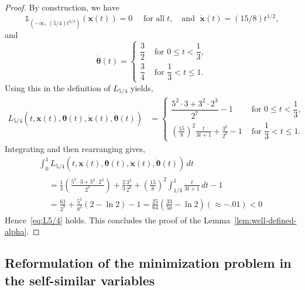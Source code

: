 \documentclass[AHL,Unicode,longabstracts]{cedram}
\newcommand{\bx}{\mathbf{x}}
\newcommand{\btheta}{\boldsymbol{\theta}}
\newcommand{\1}{\mathds{1}}
\begin{document}
\begin{proof}
By construction, we have
\[
\1_{\left(-\infty,\,(5/4) t^{3/2}\right)}(\bx(t))=0\quad\text{ for all}\;t, \quad\text{and }\;\dot{\bx}(t)=(15/8)t^{1/2},
\]
and
\[
\dot{\btheta}(t) =
\begin{cases}
\dfrac{3}{2} & \text{ for } 0\leq t<\dfrac{1}{3},
\\[0.70em]
\dfrac{3}{4}& \text{ for } \dfrac{1}{3}<t\leq 1.
\end{cases}
\]
Using this in the definition of $L_{5/4}$ yields,
\begin{align*}
L_{5/4}\left(t,\bx(t), \btheta(t), \dot{ \bx}(t), \dot{\btheta}(t)\right) &=
\begin{cases}
\dfrac{5^2\cdot 3+3^2\cdot 2^3}{2^7} -1 & \text{ for } 0\leq t<\dfrac{1}{3},
\\[0.50em]
\displaystyle \left(\frac{15}{8}\right)^2\frac{t}{3t+1} + \frac{3^2}{2^6}-1 & \text{ for } \dfrac{1}{3}<t\leq 1.
\end{cases}
\end{align*}
Integrating and then rearranging gives,
\begin{multline*}
\int_0^1L_{5/4}\left(t,\bx(t), \btheta(t), \dot{ \bx}(t), \dot{\btheta}(t)\right)\, dt \\
\begin{aligned}
&=\frac{1}{3}\left(\frac{5^2\cdot 3+3^2\cdot 2^3}{2^7}\right) + \frac{2}{3}\frac{3^2}{2^6} + \left(\frac{15}{8}\right)^2\int_{1/3}^{1}\frac{t}{3t+1}\, dt-1\\
&= \frac{61}{ 2^7}+\frac{5^2}{8^2}(2-\ln 2)-1 = \frac{25}{64}\left (\frac{33}{50} - \ln 2 \right)(\approx -.01)<0
\end{aligned}
\end{multline*}
Hence~\eqref{eq:L5/4} holds. This concludes the proof of the Lemma~\ref{lem:well-defined-alpha}.
\end{proof}



\subsection{Reformulation of the minimization problem in the self-similar variables}\label{sec:self-similar}
\end{document}

